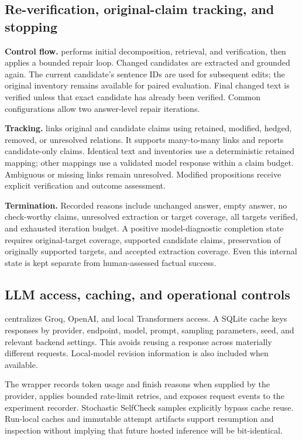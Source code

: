 \documentclass[11pt,a4paper]{article}
\newcommand{\code}[1]{\texttt{\detokenize{#1}}}
\begin{document}
\subsection{Re-verification, original-claim tracking, and stopping}
\textbf{Control flow.} \code{src/pipeline.py} performs initial decomposition, retrieval, and verification, then applies a bounded repair loop. Changed candidates are extracted and grounded again. The current candidate's sentence IDs are used for subsequent edits; the original inventory remains available for paired evaluation. Final changed text is verified unless that exact candidate has already been verified. Common configurations allow two answer-level repair iterations.

\textbf{Tracking.} \code{src/claim_tracking.py} links original and candidate claims using retained, modified, hedged, removed, or unresolved relations. It supports many-to-many links and reports candidate-only claims. Identical text and inventories use a deterministic retained mapping; other mappings use a validated model response within a claim budget. Ambiguous or missing links remain unresolved. Modified propositions receive explicit verification and outcome assessment.

\textbf{Termination.} Recorded reasons include unchanged answer, empty answer, no check-worthy claims, unresolved extraction or target coverage, all targets verified, and exhausted iteration budget. A positive model-diagnostic completion state requires original-target coverage, supported candidate claims, preservation of originally supported targets, and accepted extraction coverage. Even this internal state is kept separate from human-assessed factual success.

\subsection{LLM access, caching, and operational controls}
\code{src/llm.py} centralizes Groq, OpenAI, and local Transformers access. A SQLite cache keys responses by provider, endpoint, model, prompt, sampling parameters, seed, and relevant backend settings. This avoids reusing a response across materially different requests. Local-model revision information is also included when available.

The wrapper records token usage and finish reasons when supplied by the provider, applies bounded rate-limit retries, and exposes request events to the experiment recorder. Stochastic SelfCheck samples explicitly bypass cache reuse. Run-local caches and immutable attempt artifacts support resumption and inspection without implying that future hosted inference will be bit-identical.
\end{document}
